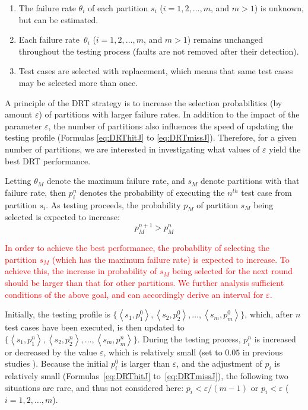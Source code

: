 \documentclass[10pt,journal,compsoc]{IEEEtran}
\begin{document}
\begin{enumerate}[1)]
  \item
  The failure rate $\theta_i$ of each partition $s_i$ ($i = 1, 2, \ldots, m$, and $m > 1$) is unknown, but can be estimated.

  \item
  Each failure rate~$\theta_i$ ($i = 1, 2, \ldots, m$, and $m > 1$) remains unchanged throughout the testing process (faults are not removed after their detection).

  \item
  Test cases are selected with replacement, which means that same test cases may be selected more than once.
\end{enumerate}

A principle of the DRT strategy is to increase the selection probabilities (by amount $\varepsilon$) of partitions with larger failure rates.
In addition to the impact of the parameter $\varepsilon$, the number of partitions also influences the speed of updating the testing profile (Formulas \ref{eq:DRThitJ} to \ref{eq:DRTmissJ}).
Therefore, for a given number of partitions, we are interested in investigating what values of $\varepsilon$ yield the best DRT performance.

Letting $\theta_M$ denote the maximum failure rate, and $s_M$ denote partitions with that failure rate, then $p_i^n$ denotes the probability of executing the $n^{th}$ test case from partition $s_i$.
As testing proceeds, the probability $p_M$ of partition $s_M$ being selected is expected to increase:
\begin{equation}
    \label{eq:exception}
    p_M^{n + 1} > p_M^{n}
\end{equation}

\textcolor{red}{In order to achieve the best performance, the probability of selecting the partition $s_M$ (which has the maximum failure rate) is expected to increase. To achieve this, the increase in probability of $s_M$ being selected for the next round should be larger than that for other partitions. We further analysis sufficient conditions of the above goal, and can accordingly derive an interval for $\varepsilon$.}

Initially, the testing profile is
$\{ \left \langle s_1,p_1^0 \right \rangle, \left \langle s_2,p_2^0 \right \rangle, \ldots, \left \langle s_m,p_m^0 \right \rangle\}$,
which, after $n$ test cases have been executed,  is then updated to
$\{ \left \langle s_1,p_1^n \right \rangle, \left \langle s_2,p_2^n \right \rangle, \ldots, \left \langle s_m,p_m^n \right \rangle\}$.
During the testing process, $p_i^n$ is increased or decreased by the value $\varepsilon$, which is relatively small (set to $0.05$ in previous studies \cite{Lv2011,li2015}).
Because the initial $p_i^0$ is larger than $\varepsilon$, and the adjustment of $p_i$ is relatively small (Formulas~\ref{eq:DRThitJ} to~\ref{eq:DRTmissJ}), the following two situations are rare, and thus not considered here:
$p_i < \varepsilon / (m - 1)$ or
$p_i < \varepsilon$ ($i = 1, 2, \ldots, m$).
\end{document}
